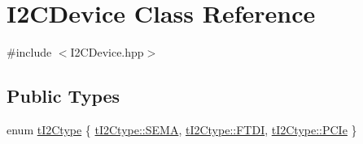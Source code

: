 \hypertarget{class_i2_c_device}{}\section{I2\+C\+Device Class Reference}
\label{class_i2_c_device}


{\ttfamily \#include $<$I2\+C\+Device.\+hpp$>$}

\subsection*{Public Types}
\begin{DoxyCompactItemize}
\item 
enum \hyperlink{class_i2_c_device_a275eefb9eb7dfd1ee0470a8bd0a73086}{t\+I2\+Ctype} \{ \hyperlink{class_i2_c_device_a275eefb9eb7dfd1ee0470a8bd0a73086a6a7b9aebb5e9f27970de13799ad47f6e}{t\+I2\+Ctype\+::\+S\+E\+MA}, 
\hyperlink{class_i2_c_device_a275eefb9eb7dfd1ee0470a8bd0a73086a9a342381cd5923d1a59fdc8c22e286b7}{t\+I2\+Ctype\+::\+F\+T\+DI}, 
\hyperlink{class_i2_c_device_a275eefb9eb7dfd1ee0470a8bd0a73086a1fec00cf102e7c421f6662b56bd61fb7}{t\+I2\+Ctype\+::\+P\+C\+Ie}
 \}
\end{DoxyCompactItemize}
